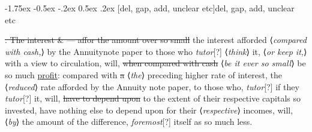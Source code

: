 \documentclass[11pt,twoside]{article}\makeatletter
\makeatletter
\renewcommand\section{\@startsection {section}{1}{\z@}%
     {-1.75ex \@plus -0.5ex \@minus -.2ex}%
     {0.5ex \@plus .2ex}%
     {\reset@font\Large\bfseries\sffamily}}
\makeatother
\begin{document}
\section[del, gap, add, unclear etc]{del, gap, add, unclear etc}\par
\sout{. The interest \& — affor the amount over so small} the interest afforded ⟨\textit{compared with cash,}⟩ by the Annuity{\hskip1pt}\newline  note paper to those who \textit{tutor}[?] ⟨\textit{think}⟩ it, ⟨\textit{or keep it,}⟩ with a view {\hskip1pt}\newline  to circulation, will, \sout{when compared with cash} ⟨\textit{be it ever so small}⟩ be {\hskip1pt}\newline  so much \uline{profit}: compared with \sout{a} ⟨\textit{the}⟩ preceding higher {\hskip1pt}\newline  rate of interest, the ⟨\textit{reduced}⟩ rate afforded by the Annuity {\hskip1pt}\newline  note paper, to those who, \textit{tutor}[?] if they \textit{tutor}[?] it, {\hskip1pt}\newline  will, \sout{have to depend upon} to the extent of their {\hskip1pt}\newline  respective capitals so invested, have nothing else {\hskip1pt}\newline  to depend upon for their ⟨\textit{respective}⟩ incomes, will, \sout{} ⟨\textit{by}⟩ the {\hskip1pt}\newline  amount of the difference, \textit{foremost}[?] itself as so {\hskip1pt}\newline  much less.
\end{document}
